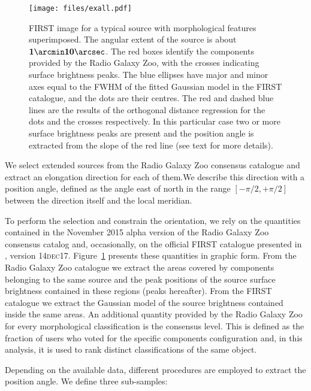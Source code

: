 			\begin{figure}
				\centering
				\texttt{[image: files/exall.pdf]}
				\caption{FIRST image for a typical source with morphological features superimposed. The angular extent of the source is about $\mathbf{1\arcmin10\arcsec}$. The red boxes identify the components provided by the Radio Galaxy Zoo, with the crosses indicating surface brightness peaks. The blue ellipses have major and minor axes equal to the FWHM of the fitted Gaussian model in the FIRST catalogue, and the dots are their centres. The red and dashed blue lines are the results of the orthogonal distance regression for the dots and the crosses respectively. In this particular case two or more surface brightness peaks are present and the position angle is extracted from the slope of the red line (see text for more details).}
				\label{fig:exall}
			\end{figure}	
			
			We select extended sources from the Radio Galaxy Zoo consensus catalogue and extract an elongation direction for each of them.We describe this direction with a position angle, defined as the angle east of north in the range $[-\pi/2, +\pi/2]$ between the direction itself and the local meridian. 
			
			To perform the selection and constrain the orientation, we rely on the quantities contained in the November 2015 alpha version of the Radio Galaxy Zoo consensus catalog and, occasionally, on the official FIRST catalogue presented in \cite{Helfand2015b}, version \textsc{14dec17}. Figure~\ref{fig:exall} presents these quantities in graphic form. From the Radio Galaxy Zoo catalogue we extract the areas covered by components belonging to the same source and the peak positions of the source surface brightness contained in these regions (peaks hereafter). From the FIRST catalogue we extract the Gaussian model of the source brightness contained inside the same areas. 
			An additional quantity provided by the Radio Galaxy Zoo for every morphological classification is the consensus level. This is defined as the fraction of users who voted for the specific components configuration and, in this analysis, it is used to rank distinct classifications of the same object. 
			
			Depending on the available data, different procedures are employed to extract the position angle. We define three sub-samples:
			
